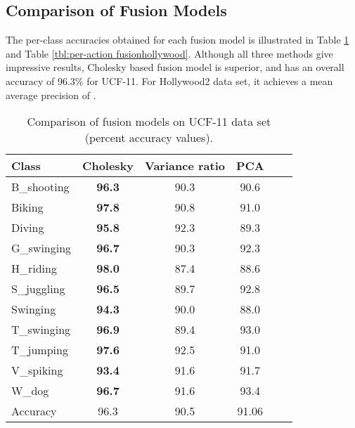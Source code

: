 \subsection{Comparison of Fusion Models}
The per-class accuracies obtained for each fusion model is illustrated in Table \ref{tbl:per-action fusionucf} and
Table \ref{tbl:per-action fusionhollywood}. Although all three methods give impressive results, Cholesky based fusion
model is superior, and has an overall accuracy of 96.3\% for UCF-11. For Hollywood2 data set, it achieves a mean average precision
of .


\begin{table}[]
\centering
\caption{Comparison of fusion models on UCF-11 data set (percent accuracy values).}\label{tbl:per-action fusionucf}
\begin{tabular}{@{} l c c c c r @{} }
\toprule
Class            & Cholesky & Variance ratio & PCA   \\ \midrule  \midrule
B\_shooting       & \textbf{96.3}    &  90.3   &  90.6  \\
Biking           & \textbf{97.8}    &  90.8   &  91.0    \\
Diving           & \textbf{95.8}    &  92.3   &  89.3   \\
G\_swinging       & \textbf{96.7}    &  90.3   &  92.3   \\
H\_riding         & \textbf{98.0}    &  87.4   &  88.6    \\
S\_juggling       & \textbf{96.5}    &  89.7   &  92.8   \\
Swinging         & \textbf{94.3}    &  90.0   &  88.0    \\
T\_swinging       & \textbf{96.9}    &  89.4   &  93.0   \\
T\_jumping        & \textbf{97.6}    &  92.5   &  91.0    \\
V\_spiking        &\textbf{93.4}    &  91.6   &  91.7   \\
W\_dog            & \textbf{96.7}    &  91.6   &  93.4   \\ \midrule
Accuracy &  96.3   &  90.5   &   91.06   \\ \bottomrule
\end{tabular}
\end{table}

